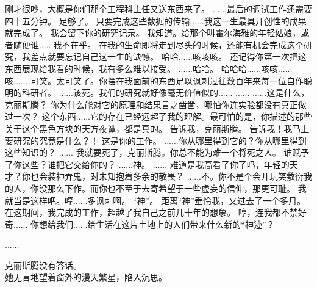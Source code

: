 \documentclass[openany]{book}
\begin{document}
\begin{dialogue}
     刚才很吵，大概是你们那个工程科主任又送东西来了。
     ......最后的调试工作还需要四十五分钟。
     足够了。
     只要完成这些数据的传输......我这一生最具开创性的成果就完成了。
     我会留下你的研究记录。
     我知道。给那个叫霍尔海雅的年轻姑娘，或者随便谁......我不在乎。
     在我的生命即将走到尽头的时候，还能有机会完成这个研究，我差点就要忘记自己这一生的缺憾。
     哈哈......咳咳咳。
     还记得你第一次把这东西展现给我看的时候，我有多么难以接受。
     ......哈哈。
     哈哈哈......咳咳......咳......
     可笑。太可笑了。你摆在我面前的东西足以讽刺过往数百年来每一位自作聪明的科研者。
     ......该死。我们的研究就好像毫无价值似的......
     ......
     ......这是什么，克丽斯腾？
     你为什么能对它的原理和结果言之凿凿，哪怕你连实验都没有真正做过一次？
     这个东西......它的存在已经远超了我的理解。最可怕的是，你描述的那些关于这个黑色方块的天方夜谭，都是真的。
     告诉我，克丽斯腾。
     告诉我！我马上要研究的究竟是什么？！
     这是你的工作。
     ......你从哪里得到它的？你从哪里得到这些知识的？
     ......
     我就要死了，克丽斯腾。你总不能为难一个将死之人。
     谁赋予了你这些？谁把它交给你的？
     ......神。
     ......
     难道是我高看了你了吗，年轻的天才？你也会装神弄鬼，对未知抱着多余的敬畏？
     ......不。你不是个会开玩笑敷衍我的人，你没那么下作。而你也不至于去寄希望于一些虚妄的信仰，那更可耻。
     我就当是这样吧。哼......多讽刺啊。
     “神”。
     距离“神”垂怜我，又过去了一个多月。
     在这期间，我完成的工作，超越了我自己之前几十年的想象。
     哼，连我都不禁好奇......
     你想给我们......给生活在这片土地上的人们带来什么新的“神迹”？
\end{dialogue}

\begin{dialogue}
     ......\par
    克丽斯腾没有答话。\\
    她无言地望着窗外的漫天繁星，陷入沉思。
\end{dialogue}
\end{document}
